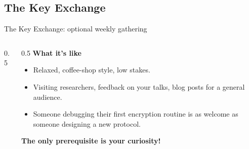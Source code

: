 \ifdefined\PRESENTATION\else\PassOptionsToClass{handout}{beamer}\fi\documentclass[aspectratio=169, lualatex]{beamer}
\begin{document}
\subsection{The Key Exchange}

\begin{frame}{The Key Exchange: optional weekly gathering}
	\begin{columns}[c]
		\begin{column}{0.5\textwidth}
		\end{column}
		\begin{column}{0.5\textwidth}
			\textbf{What it's like}
			\begin{itemize}[<+->]
				\item Relaxed, coffee-shop style, low stakes.
				\item Visiting researchers, feedback on your talks, blog posts for a general audience.
				\item Someone debugging their first encryption routine is as welcome as someone designing a new protocol.
			\end{itemize}
			\vspace{0.5cm}
			\textcolor{cipherprimary}{\textbf{The only prerequisite is your curiosity!}}
		\end{column}
	\end{columns}
\end{frame}
\end{document}
